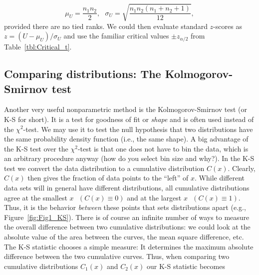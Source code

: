 \begin{equation}
\mu_U = \frac{n_1 n_2}{2}, \ \ \  \sigma _U = \sqrt{\frac{n_1 n_2(n_1 + n_2 + 1)}{12}     },
\label{eq:U_approx}
\end{equation}
provided there are no tied ranks.  We could then evaluate standard $z$-scores as $z = (U - \mu_U)/\sigma_U$
and use the familiar critical values $\pm z_{\alpha/2}$ from Table~\ref{tbl:Critical_t}.

\subsection{Comparing distributions: The Kolmogorov-Smirnov test}


	Another very useful nonparametric method is the Kolmogorov-Smirnov test  (or K-S for short).  It is a 
test for goodness of fit or \emph{shape} and is often used instead of the $\chi^2 $-test.
We may use it to test the null hypothesis that two distributions have the same probability density function
(i.e., the same shape).  A big advantage of the 
K-S test over the $\chi^2$-test is that one does not have to bin the data, which is an arbitrary procedure 
anyway (how do you select bin size and why?).  In the K-S test we convert the data distribution 
to a cumulative distribution $C(x)$.  Clearly, $C(x)$ then gives the fraction of data points to the ``left'' of $x$.  
While different data sets will in general have different distributions, all cumulative distributions 
agree at the smallest $x \mbox{ } (C(x) \equiv 0)$ and at the largest $x \mbox{ } (C(x) \equiv 1)$.
Thus, it is the behavior \emph{between} 
these points that sets distributions apart (e.g., Figure~\ref{fig:Fig1_KS}).  There is of course an infinite number of ways to 
measure the overall difference between two cumulative distributions: we could look at the absolute 
value of the area between the curves, the mean square difference, etc.  The K-S statistic chooses 
a simple measure: It determines the maximum absolute difference between the two cumulative 
curves.  Thus, when comparing two cumulative distributions $C_1(x)$ and $C_2(x)$ our K-S statistic becomes

